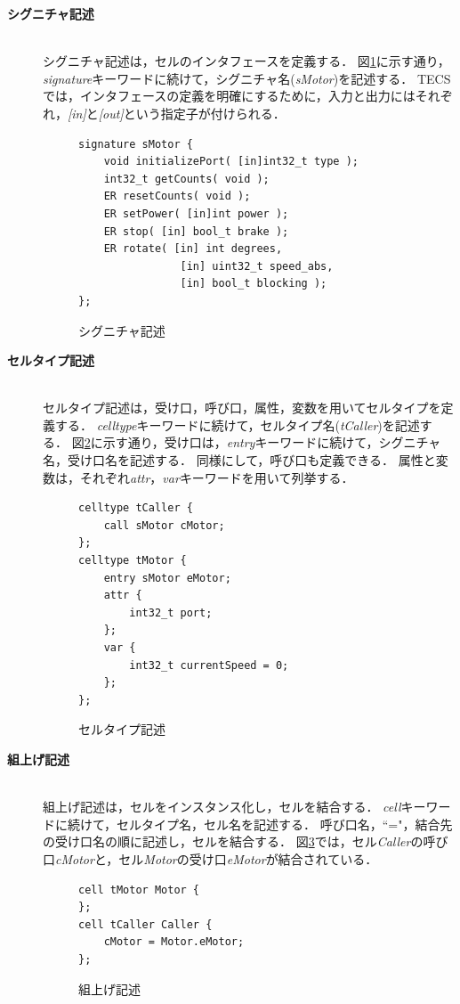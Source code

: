 \documentclass[submit,techrep]{ipsj_v2/UTF8/ipsj}
\begin{document}
\begin{description}
    \item[{\bf シグニチャ記述}]\mbox{}\\
        シグニチャ記述は，セルのインタフェースを定義する．
        図\ref{signature}に示す通り，{\it signature}キーワードに続けて，シグニチャ名({\it sMotor})を記述する．
        TECSでは，インタフェースの定義を明確にするために，入力と出力にはそれぞれ，{\it [in]}と{\it [out]}という指定子が付けられる．
        
\begin{figure}[t]
\centering
\begin{lstlisting}
signature sMotor {
    void initializePort( [in]int32_t type );
    int32_t getCounts( void );
    ER resetCounts( void );
    ER setPower( [in]int power );
    ER stop( [in] bool_t brake );
    ER rotate( [in] int degrees,
                [in] uint32_t speed_abs,
                [in] bool_t blocking );
};
\end{lstlisting}
\caption{シグニチャ記述}
\label{signature}
\end{figure}

    \item[{\bf セルタイプ記述}]\mbox{}\\
        セルタイプ記述は，受け口，呼び口，属性，変数を用いてセルタイプを定義する．
        {\it celltype}キーワードに続けて，セルタイプ名({\it tCaller})を記述する．
        図\ref{celltype}に示す通り，受け口は，{\it entry}キーワードに続けて，シグニチャ名，受け口名を記述する．
        同様にして，呼び口も定義できる．
        属性と変数は，それぞれ{\it attr}，{\it var}キーワードを用いて列挙する．

\begin{figure}[t]
\centering
\begin{lstlisting}
celltype tCaller {
    call sMotor cMotor;
};
celltype tMotor {
    entry sMotor eMotor;
    attr {
        int32_t port;
    };
    var {
        int32_t currentSpeed = 0;
    };
};
\end{lstlisting}
\caption{セルタイプ記述}  
\label{celltype}
\end{figure}

    \item[{\bf 組上げ記述}]\mbox{}\\
        組上げ記述は，セルをインスタンス化し，セルを結合する．
        {\it cell}キーワードに続けて，セルタイプ名，セル名を記述する．
        呼び口名，``="，結合先の受け口名の順に記述し，セルを結合する．
        図\ref{build}では，セル{\it Caller}の呼び口{\it cMotor}と，セル{\it Motor}の受け口{\it eMotor}が結合されている．
        
\begin{figure}[t]
\centering
\begin{lstlisting}
cell tMotor Motor {
};
cell tCaller Caller {
    cMotor = Motor.eMotor;
};
\end{lstlisting}
\caption{組上げ記述}
\label{build}
\end{figure}

\end{description}
\end{document}
